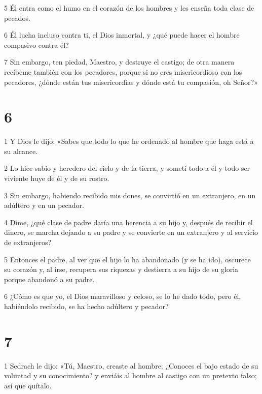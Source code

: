 \par 5 Él entra como el humo en el corazón de los hombres y les enseña toda clase de pecados.

\par 6 Él lucha incluso contra ti, el Dios inmortal, y ¿qué puede hacer el hombre compasivo contra él?

\par 7 Sin embargo, ten piedad, Maestro, y destruye el castigo; de otra manera recíbeme también con los pecadores, porque si no eres misericordioso con los pecadores, ¿dónde están tus misericordias y dónde está tu compasión, oh Señor?»


\chapter{6}

\par 1 Y Dios le dijo: «Sabes que todo lo que he ordenado al hombre que haga está a su alcance.

\par 2 Lo hice sabio y heredero del cielo y de la tierra, y sometí todo a él y todo ser viviente huye de él y de su rostro.

\par 3 Sin embargo, habiendo recibido mis dones, se convirtió en un extranjero, en un adúltero y en un pecador.

\par 4 Dime, ¿qué clase de padre daría una herencia a su hijo y, después de recibir el dinero, se marcha dejando a su padre y se convierte en un extranjero y al servicio de extranjeros?

\par 5 Entonces el padre, al ver que el hijo lo ha abandonado (y se ha ido), oscurece su corazón y, al irse, recupera sus riquezas y destierra a su hijo de su gloria porque abandonó a su padre.

\par 6 ¿Cómo es que yo, el Dios maravilloso y celoso, se lo he dado todo, pero él, habiéndolo recibido, se ha hecho adúltero y pecador?

\chapter{7}

\par 1 Sedrach le dijo: «Tú, Maestro, creaste al hombre; ¿Conoces el bajo estado de su voluntad y su conocimiento? y enviáis al hombre al castigo con un pretexto falso; así que quítalo.

